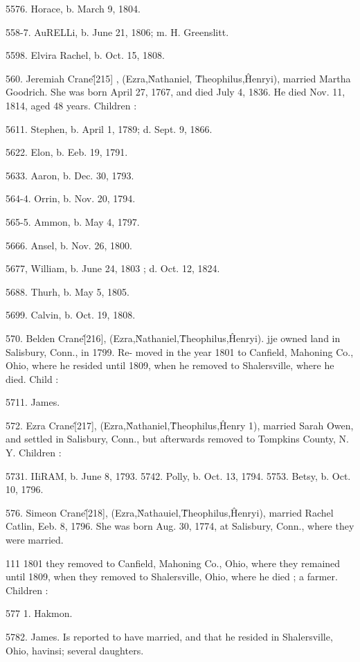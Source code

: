 \documentclass{book}
\begin{document}
5576. Horace, b. March 9, 1804. 

558-7. AuRELLi, b. June 21, 1806; m. H. Greenslitt. 

5598. Elvira Rachel, b. Oct. 15, 1808. 

560. Jeremiah Crane\^ [215] , (Ezra,\^ Nathaniel, \^ Theophilus,\^ 
Henryi), married Martha Goodrich. She was born April 27, 
1767, and died July 4, 1836. He died Nov. 11, 1814, aged 48 
years. Children : 

5611. Stephen, b. April 1, 1789; d. Sept. 9, 1866. 

5622. Elon, b. Eeb. 19, 1791. 

5633. Aaron, b. Dec. 30, 1793.  

564-4. Orrin, b. Nov. 20, 1794. 

565-5. Ammon, b. May 4, 1797. 

5666. Ansel, b. Nov. 26, 1800. 

5677, William, b. June 24, 1803 ; d. Oct. 12, 1824. 

5688. Thurh, b. May 5, 1805. 

5699. Calvin, b. Oct. 19, 1808. 

570. Belden Crane\^ [216], (Ezra,\^ Nathaniel,\^ Theophilus,\^ 
Henryi). jje owned land in Salisbury, Conn., in 1799. Re- 
moved in the year 1801 to Canfield, Mahoning Co., Ohio, where 
he resided until 1809, when he removed to Shalersville, where he 
died. Child : 

5711. James. 

572. Ezra Crane\^ [217], (Ezra,\^ Nathaniel,\^ Theophilus,\^ 
Henry 1), married Sarah Owen, and settled in Salisbury, Conn., 
but afterwards removed to Tompkins County, N. Y. Children : 

5731. IIiRAM, b. June 8, 1793. 
5742. Polly, b. Oct. 13, 1794. 
5753. Betsy, b. Oct. 10, 1796. 

576. Simeon Crane\^ [218], (Ezra,\^ Nathauiel,\^ Theophilus,\^ 
Henryi), married Rachel Catlin, Eeb. 8, 1796. She was born 
Aug. 30, 1774, at Salisbury, Conn., where they were married. 




111 1801 they removed to Canfield, Mahoning Co., Ohio, where 
they remained until 1809, when they removed to Shalersville, 
Ohio, where he died ; a farmer. Children : 

577  1. Hakmon. 

5782. James. Is reported to have married, and that he resided in 
Shalersville, Ohio, havinsi; several daughters. 
\end{document}
